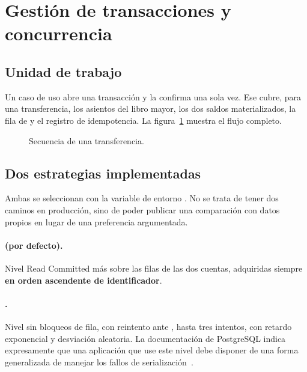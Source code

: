 \section{Gestión de transacciones y concurrencia}
\label{sec:transacciones}

\subsection{Unidad de trabajo}

Un caso de uso abre una transacción y la confirma una sola vez. Ese
 cubre, para una transferencia, los asientos del libro mayor,
los dos saldos materializados, la fila de  y el registro de
idempotencia. La figura~\ref{fig:secuencia} muestra el flujo completo.

\begin{figure}[htbp]
\centering
\resizebox{\textwidth}{!}{}
\caption{Secuencia de una transferencia.}
\label{fig:secuencia}
\end{figure}

\subsection{Dos estrategias implementadas}

Ambas se seleccionan con la variable de entorno
. No se trata de tener dos caminos en
producción, sino de poder publicar una comparación con datos propios en lugar
de una preferencia argumentada.

\paragraph{ (por defecto).} Nivel Read Committed más
 sobre las filas de las dos cuentas, adquiridas
siempre \textbf{en orden ascendente de identificador}.

\paragraph{.} Nivel  sin bloqueos de
fila, con reintento ante , hasta tres intentos, con
retardo exponencial y desviación aleatoria. La documentación de PostgreSQL
indica expresamente que una aplicación que use este nivel debe disponer de una
forma generalizada de manejar los fallos de serialización~\cite{pg16iso}.

